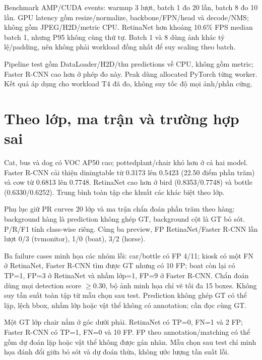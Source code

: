 Benchmark AMP/CUDA events: warmup 3 lượt, batch 1 đo 20 lần, batch 8 đo 10 lần.
GPU latency gồm resize/normalize, backbone/FPN/head và decode/NMS;
không gồm JPEG/H2D/metric CPU. RetinaNet hơn khoảng 10.6\% FPS median batch 1,
nhưng P95 không cùng thứ tự. Batch 1 và 8 dùng ảnh khác tỷ lệ/padding,
nên không phải workload đồng nhất để suy scaling theo batch.

Pipeline test gồm DataLoader/H2D/thu predictions về CPU, không gồm metric;
Faster R-CNN cao hơn ở phép đo này. Peak dùng allocated PyTorch từng worker.
Kết quả áp dụng cho workload T4 đã đo, không suy tốc độ mọi ảnh/phần cứng.

\section{Theo lớp, ma trận và trường hợp sai}
\label{sec:a2-errors}
Cat, bus và dog có VOC AP50 cao; pottedplant/chair khó hơn ở cả hai model.
Faster R-CNN cải thiện diningtable từ 0.3173 lên 0.5423 (22.50 điểm phần trăm)
và cow từ 0.6813 lên 0.7748. RetinaNet cao hơn ở bird (0.8353/0.7748)
và bottle (0.6330/0.6252). Trung bình toàn tập che khuất các khác biệt theo lớp.


Phụ lục giữ PR curves 20 lớp và ma trận chẩn đoán phần trăm theo hàng:
background hàng là prediction không ghép GT, background cột là GT bỏ sót.
P/R/F1 tính class-wise riêng. Cùng ba preview, FP RetinaNet/Faster R-CNN
lần lượt 0/3 (tvmonitor), 1/0 (boat), 3/2 (horse).

Ba failure cases minh họa các nhóm lỗi: car/bottle có FP 4/11; kiosk có
một FN ở RetinaNet, Faster R-CNN tìm được GT nhưng có 10 FP; boat còn lại
có TP=1, FP=3 ở RetinaNet và nhầm lớp=1, FP=9 ở Faster R-CNN.
Chẩn đoán dùng mọi detection score $\geq0.30$, bộ ảnh minh họa chỉ vẽ tối đa 15 boxes.
Không suy tần suất toàn tập từ mẫu chọn sau test. Prediction không ghép GT
có thể lặp, lệch bbox, nhầm lớp hoặc vật thể không có annotation; cần đọc cùng GT.

Một GT lớp chair nằm ở góc dưới phải. RetinaNet có TP=0, FN=1 và 2 FP;
Faster R-CNN có TP=1, FN=0 và 10 FP. FP theo annotation/matching có thể gồm
dự đoán lặp hoặc vật thể không được gán nhãn. Mẫu chọn sau test chỉ minh họa
đánh đổi giữa bỏ sót và dự đoán thừa, không ước lượng tần suất lỗi.

